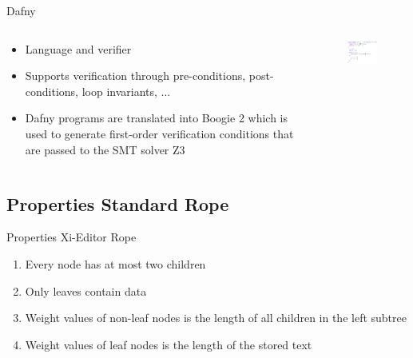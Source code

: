 \documentclass{beamer}
\begin{document}
\begin{frame}{Dafny}
  \begin{columns}
    \begin{column}{0.5\textwidth}
        \begin{itemize}
            \item Language and verifier
            \item Supports verification through pre-conditions, post-conditions, loop invariants, ...
            \item Dafny programs are translated into Boogie 2 which is used to generate first-order verification conditions that are passed to the SMT solver Z3
        \end{itemize}
    \end{column}
    \begin{column}{0.5\textwidth}
      \begin{figure}
          \centering
          \includegraphics[width=5.5cm]{images/dafny.png}
      \end{figure}
    \end{column}
  \end{columns}
\end{frame}

\subsection{Properties Standard Rope}

\begin{frame}{Properties Xi-Editor Rope}
    \begin{enumerate}
        \item Every node has at most two children
        \item Only leaves contain data
        \item Weight values of non-leaf nodes is the length of all children in the left subtree
        \item Weight values of leaf nodes is the length of the stored text
    \end{enumerate}
\end{frame}
\end{document}
